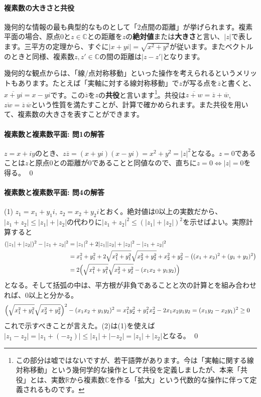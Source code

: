 \paragraph{複素数の大きさと共役}

幾何的な情報の最も典型的なものとして「$2$点間の距離」が挙げられます。複素平面の場合、原点$0$と$z\in\mathbb{C}$との距離を$z$の\textbf{絶対値}または\textbf{大きさ}と言い、$|z|$で表します。三平方の定理から、すぐに$|x+yi|=\sqrt{x^2+y^2}$が従います。またベクトルのときと同様、複素数$z,z'\in\mathbb{C}$の間の距離は$|z-z'|$となります。

幾何的な観点からは、「線/点対称移動」といった操作を考えられるというメリットもあります。たとえば「実軸に対する線対称移動」で$z$が写る点を$\overline{z}$と書くと、$\overline{x+yi}=x-yi$です。この$\overline{z}$を$z$の\textbf{共役}と言います\footnote{この部分は嘘ではないですが、若干語弊があります。今は「実軸に関する線対称移動」という幾何学的な操作として共役を定義しましたが、本来「共役」とは、実数$\mathbb{R}$から複素数$\mathbb{C}$を作る「拡大」という代数的な操作に伴って定義されるものです。}。共役は$\overline{z+w}=\overline{z}+\overline{w}$, $\overline{zw}=\overline{z}\,\overline{w}$という性質を満たすことが、計算で確かめられます。また共役を用いて、複素数の大きさを表すことができます。


\paragraph{複素数と複素数平面: 問1の解答}
$z=x+iy$のとき、$z\overline{z}=(x+yi)(x-yi)=x^2+y^2=|z|^2$となる。$z=0$であることは$z$と原点$0$との距離が$0$であることと同値なので、直ちに$z=0\Leftrightarrow|z|=0$を得る。 \qed

\paragraph{複素数と複素数平面: 問4の解答}

(1) $z_1 = x_1+y_1 i$, $z_2 = x_2 + y_2 i$とおく。絶対値は$0$以上の実数だから、$|z_1+z_2|\leq |z_1|+|z_2|$の代わりに$|z_1+z_2|^2\leq (|z_1|+|z_2|)^2$を示せばよい。実際計算すると
\begin{align*}
(|z_1|+|z_2|)^2 - |z_1+z_2|^2 
&= |z_1|^2 + 2|z_1||z_2| + |z_2|^2 - |z_1+z_2|^2 \\
&= x_1^2+y_1^2 + 2\sqrt{x_1^2+y_1^2}\sqrt{x_2^2+y_2^2} + x_2^2 + y_2^2 - \bigl((x_1+x_2)^2+(y_1+y_2)^2\bigr) \\
&= 2\Bigl(\sqrt{x_1^2+y_1^2}\sqrt{x_2^2+y_2^2} -(x_1x_2+y_1y_2) \Bigr)
\end{align*}
となる。そして括弧の中は、平方根が非負であることと次の計算とを組み合わせれば、$0$以上と分かる。
\begin{align*}
\Bigl(\sqrt{x_1^2+y_1^2}\sqrt{x_2^2+y_2^2}\Bigr)^2 - (x_1x_2+y_1y_2)^2
&= x_1^2y_2^2+y_1^2x_2^2 - 2x_1x_2y_1y_2 = (x_1y_2-x_2y_1)^2 \geq 0
\end{align*}
これで示すべきことが言えた。(2)は(1)を使えば$|z_1-z_2| = |z_1 + (-z_2) | \leq |z_1|+|{-z_2}| = |z_1| + |z_2|$となる。 \qed


